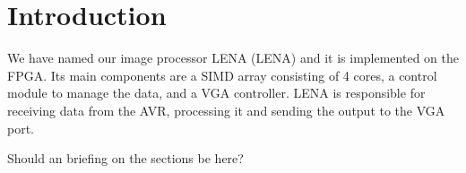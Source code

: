 \section{Introduction}

We have named our image processor \acs{LENA} (\acl{LENA}) and it is implemented
on the \ac{FPGA}. Its main components are a \ac{SIMD} array consisting of 4
cores, a control module to manage the data, and a \ac{VGA} controller. \ac{LENA}
is responsible for receiving data from the AVR, processing it and sending the
output to the \ac{VGA} port.

{\sc Should an briefing on the sections be here?}
